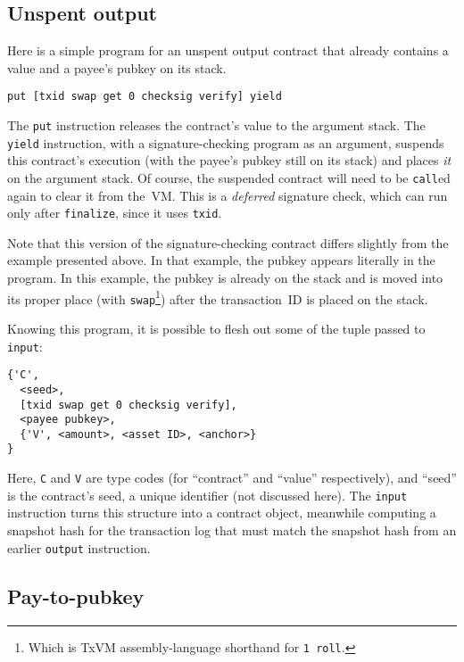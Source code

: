 \documentclass{article}
\newcommand{\txvm}{TxVM}
\begin{document}
\subsection{Unspent output}

Here is a simple program for an unspent output contract that already
contains a value and a payee's pubkey on its stack.

\begin{verbatim}
put [txid swap get 0 checksig verify] yield
\end{verbatim}

The \texttt{put} instruction releases the contract's value to the
argument stack. The \texttt{yield} instruction, with a
signature-checking program as an argument, suspends this contract's
execution (with the payee's pubkey still on its stack) and places
\emph{it} on the argument stack. Of course, the suspended contract
will need to be \texttt{call}ed again to clear it from the~VM. This is
a \textit{deferred} signature check, which can run only after
\texttt{finalize}, since it uses \texttt{txid}.

Note that this version of the signature-checking contract differs
slightly from the example presented above. In that example, the pubkey
appears literally in the program. In this example, the pubkey is
already on the stack and is moved into its proper place (with
\texttt{swap}\footnote{Which is \txvm{} assembly-language shorthand
  for \texttt{1~roll}.}) after the transaction~ID is placed on the
stack.

Knowing this program, it is possible to flesh out some of the tuple
passed to \texttt{input}:

\begin{verbatim}
{'C',
  <seed>,
  [txid swap get 0 checksig verify],
  <payee pubkey>,
  {'V', <amount>, <asset ID>, <anchor>}
}
\end{verbatim}

Here, \texttt{C} and \texttt{V} are type codes (for ``contract'' and
``value'' respectively), and ``seed'' is the contract's seed, a unique
identifier (not discussed here). The \texttt{input} instruction turns
this structure into a contract object, meanwhile computing a snapshot
hash for the transaction log that must match the snapshot hash from an
earlier \texttt{output} instruction.

\subsection{Pay-to-pubkey}
\end{document}
